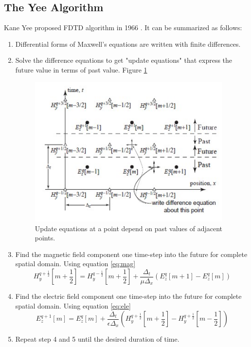 \subsection{The Yee Algorithm}
Kane Yee proposed FDTD algorithm in 1966%
. It can be summarized as follows:
\begin{enumerate}
\item Differential forms of Maxwell's equations are written with finite differences.
\item Solve the difference equations to get "update equations" that express the future value in terms of past value. Figure \ref{fig:fdtd}
\begin{figure}[htbp]
	\centering
		\includegraphics[width=4in]{Pictures/fdtd.jpg}
	\caption[FDTD update equations]{Update equations at a point depend on past values of adjacent points.}
	\label{fig:fdtd}
\end{figure} 
\item Find the magnetic field component one time-step into the future for complete spatial domain. Using equation \eqref{eq:mag}
\begin{equation}
	H_y^{q+\frac {1}{2}} \left[ m + \frac {1}{2} \right] = H_y^{q-\frac {1}{2}} \left[ m + \frac {1}{2} \right]
+ \frac {\Delta_t}{\mu\Delta_x} \left( E_z^q \left[ m+1 \right] - E_z^q \left[m\right] \right)
\label{eq:mag}
\end{equation}
\item Find the electric field component one time-step into the future for complete spatial domain. Using equation \eqref{eq:ele}
\begin{equation}
 E_z^{q+1} \left[m\right] =  E_z^q \left[m\right] + \frac {\Delta_t}{\epsilon\Delta_x}  \left( H_y^{q+\frac {1}{2}} \left[ m + \frac {1}{2} \right] - H_y^{q+\frac {1}{2}} \left[ m - \frac {1}{2} \right]  \right)
\label{eq:ele}
\end{equation}
\item Repeat step 4 and 5 until the desired duration of time.
\end{enumerate}


